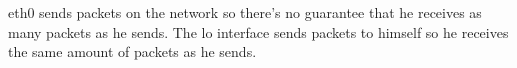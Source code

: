 eth0 sends packets on the network so there's no guarantee that he receives as many packets as he sends.
The lo interface sends packets to himself so he receives the same amount of packets as he sends.